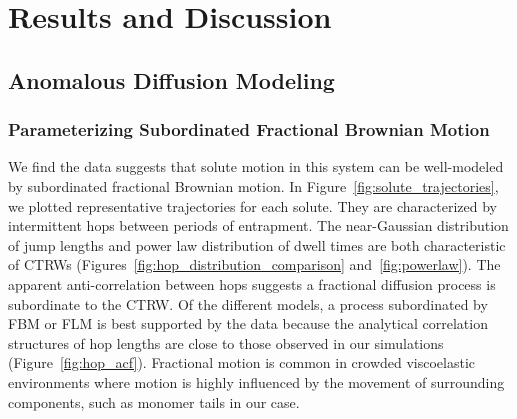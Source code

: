 \documentclass[aps,pre,preprint,groupedaddress,longbibliography]{revtex4-2}
\begin{document}
  \section{Results and Discussion}
  
  \subsection{Anomalous Diffusion Modeling}\label{section:sFBM}
  
  \subsubsection{Parameterizing Subordinated Fractional Brownian Motion}\label{section:AD_parameterization}

  We find the data suggests that solute motion in this system can be
  well-modeled by subordinated fractional Brownian motion. In
  Figure~\ref{fig:solute_trajectories}, we plotted representative trajectories
  for each solute. They are characterized by intermittent hops between periods
  of entrapment. The near-Gaussian distribution of jump lengths and power law
  distribution of dwell times are both characteristic of CTRWs
  (Figures~\ref{fig:hop_distribution_comparison} and~\ref{fig:powerlaw}).  The
  apparent anti-correlation between hops suggests a fractional diffusion
  process is subordinate to the CTRW. Of the different models, a process
  subordinated by FBM or FLM is best supported by the data because the
  analytical correlation structures of hop lengths are close to those observed
  in our simulations (Figure~\ref{fig:hop_acf}). Fractional motion is common
  in crowded viscoelastic environments where motion is highly influenced by
  the movement of surrounding components, such as monomer tails in our
  case.~\cite{ernst_fractional_2012}
  
\end{document}
